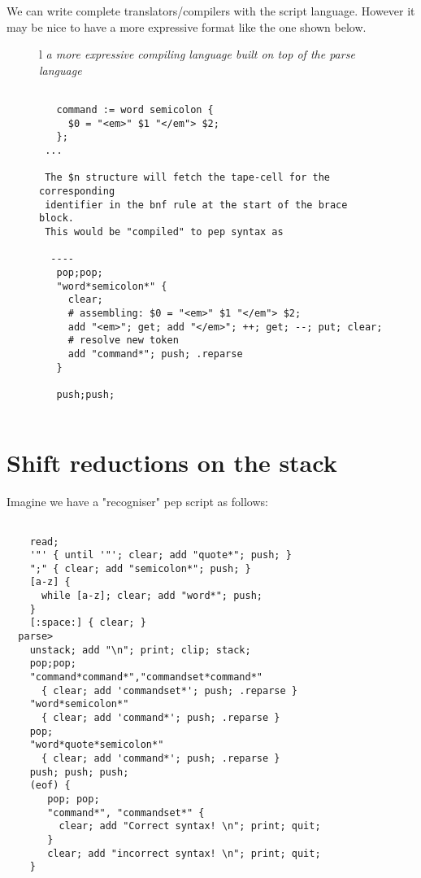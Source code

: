 \documentclass[a4paper,12pt]{article}
\begin{document}
 We can write complete translators/compilers with the script language.
 However it may be nice to have a more expressive format like the one shown
 below.
 \begin{figure}
 \begin{tabular}{ l }
 \emph{ a more expressive compiling language built on top of the parse language } \\ 
 \begin{lstlisting}[breaklines] 

   command := word semicolon {
     $0 = "<em>" $1 "</em"> $2;
   };
 ...
   
 The $n structure will fetch the tape-cell for the corresponding 
 identifier in the bnf rule at the start of the brace block.
 This would be "compiled" to pep syntax as 

  ----
   pop;pop;
   "word*semicolon*" {
     clear; 
     # assembling: $0 = "<em>" $1 "</em"> $2;
     add "<em>"; get; add "</em>"; ++; get; --; put; clear;
     # resolve new token 
     add "command*"; push; .reparse
   }

   push;push;
  
 \end{lstlisting} 
 \end{tabular} 

 \end{figure}


\section{Shift reductions on the stack}

  Imagine we have a "recogniser" pep script as follows: 
 \begin{lstlisting}[breaklines] 

    read; 
    '"' { until '"'; clear; add "quote*"; push; }
    ";" { clear; add "semicolon*"; push; }
    [a-z] { 
      while [a-z]; clear; add "word*"; push; 
    } 
    [:space:] { clear; }
  parse>
    unstack; add "\n"; print; clip; stack; 
    pop;pop;
    "command*command*","commandset*command*"
      { clear; add 'commandset*'; push; .reparse }
    "word*semicolon*" 
      { clear; add 'command*'; push; .reparse }      
    pop;
    "word*quote*semicolon*" 
      { clear; add 'command*'; push; .reparse }      
    push; push; push;
    (eof) { 
       pop; pop;
       "command*", "commandset*" {
         clear; add "Correct syntax! \n"; print; quit;
       }
       clear; add "incorrect syntax! \n"; print; quit;
    }
  
 \end{lstlisting} 
\end{document}
